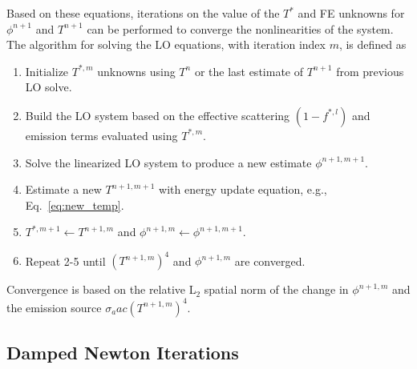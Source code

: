 Based on these equations, iterations on the value of the $T^*$ and FE unknowns for $\phi^{n+1}$ and $T^{n+1}$ can be performed to converge the nonlinearities of the system. The algorithm for solving the LO equations, with iteration index
$m$, is defined as
\begin{enumerate}
    \item Initialize $T^{*,m}$ unknowns using $T^n$ or the last estimate of $T^{n+1}$ from
        previous LO solve.
    \item  Build the LO system based on the effective scattering $(1-f^{*,l})$ and emission terms
        evaluated using $T^{*,m}$.
    \item Solve the linearized LO system to produce a new estimate $\phi^{n+1,m+1}$.
    \item Estimate a new $T^{n+1,m+1}$ with energy update equation, e.g., Eq.~\eqref{eq:new_temp}.
       \item $T^{*,m+1}\leftarrow{T}^{n+1,m}$ and $\phi^{n+1,m} \leftarrow
           \phi^{n+1,m+1}$.
    \item Repeat 2-5 until $(T^{n+1,m})^4$ and $\phi^{n+1,m}$ are converged.
\end{enumerate}
Convergence is based on the relative L$_2$ spatial norm of the change in $\phi^{n+1,m}$
and the emission source $\sigma_a a c \left(T^{n+1,m}\right)^4$.

\subsection{Damped Newton Iterations}
\label{app:damped_newton}

